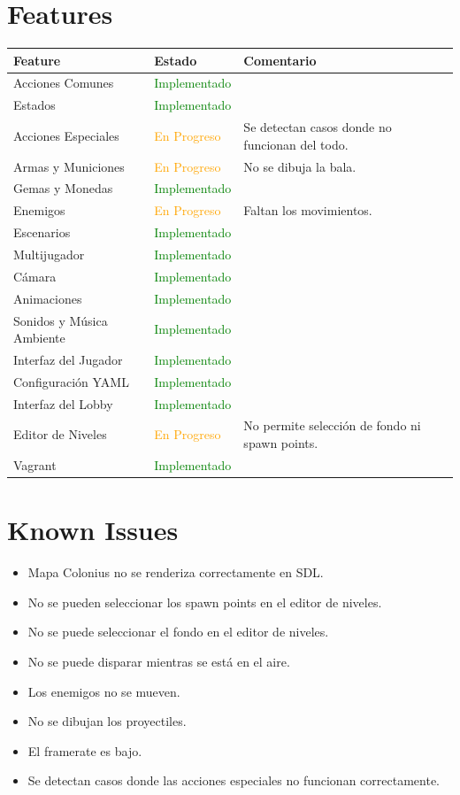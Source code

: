 \documentclass[titlepage,a4paper]{article}
\begin{document}
\section{Features}
\begin{tabular}{ | l | l | l | }
  \hline
  \textbf{Feature} & \textbf{Estado} & \textbf{Comentario} \\ \hline
  Acciones Comunes & \textcolor{green}{Implementado} & \\ \hline
  Estados & \textcolor{green}{Implementado} & \\ \hline
  Acciones Especiales & \textcolor{orange}{En Progreso} & Se detectan casos donde no funcionan del todo. \\ \hline
  Armas y Municiones & \textcolor{orange}{En Progreso} & No se dibuja la bala. \\ \hline
  Gemas y Monedas & \textcolor{green}{Implementado} & \\ \hline
  Enemigos & \textcolor{orange}{En Progreso} & Faltan los movimientos. \\ \hline
  Escenarios & \textcolor{green}{Implementado} & \\ \hline
  Multijugador & \textcolor{green}{Implementado} & \\ \hline
  Cámara & \textcolor{green}{Implementado} & \\ \hline
  Animaciones & \textcolor{green}{Implementado} & \\ \hline
  Sonidos y Música Ambiente & \textcolor{green}{Implementado} & \\ \hline
  Interfaz del Jugador & \textcolor{green}{Implementado} & \\ \hline
  Configuración YAML & \textcolor{green}{Implementado} & \\ \hline
  Interfaz del Lobby & \textcolor{green}{Implementado} & \\ \hline
  Editor de Niveles & \textcolor{orange}{En Progreso} & No permite selección de fondo ni spawn points. \\ \hline
  Vagrant & \textcolor{green}{Implementado} & \\ \hline
\end{tabular}

\section{Known Issues}
\begin{itemize}
  \item Mapa Colonius no se renderiza correctamente en SDL.
  \item No se pueden seleccionar los spawn points en el editor de niveles.
  \item No se puede seleccionar el fondo en el editor de niveles.
  \item No se puede disparar mientras se está en el aire.
  \item Los enemigos no se mueven.
  \item No se dibujan los proyectiles.
  \item El framerate es bajo.
  \item Se detectan casos donde las acciones especiales no funcionan correctamente.
\end{itemize}
\end{document}

